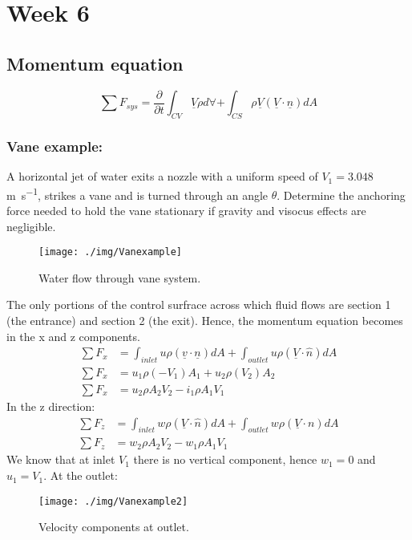 \chapter{Week 6}
\section{Momentum equation}
\begin{equation}
  \sum F_{sys} = \frac{\partial}{\partial t} \int_{CV} \underline{V} \rho d \forall + \int_{CS} \rho \underline{V} (\underline{V} \cdot \underline{n}) dA
\end{equation}
\subsection{Vane example:}
A horizontal jet of water exits a nozzle with a uniform speed of $V_1 = 3.048$ \si{\meter\per\second}, strikes a vane and is turned through an angle $\theta$. Determine the anchoring force needed to hold the vane stationary if gravity and visocus effects are negligible.
\begin{figure}[h]
  \centering
  \texttt{[image: ./img/Vanexample]}
  \caption{Water flow through vane system.}
\end{figure}
The only portions of the control surfrace across which fluid flows are section 1 (the entrance) and section 2 (the exit). Hence, the momentum equation becomes in the x and z components.
\begin{align}
  \sum F_x & = \int_{inlet} u \rho (\underline{v} \cdot \underline{n}) dA + \int_{outlet} u \rho (\underline{V} \cdot \hat{n}) dA \\
  \sum F_x & = u_1 \rho (-V_1) A_1 + u_2 \rho (V_2) A_2                                                                           \\
  \sum F_x & = u_2 \rho A_2 V_2 - i_1 \rho A_1 V_1
\end{align}
In the z direction:
\begin{align}
  \sum F_z & = \int_{inlet} w \rho (\underline{V}\cdot \hat{n}) dA + \int_{outlet} w \rho (\underline{V} \cdot {n}) dA \\
  \sum F_z & = w_2 \rho A_2 V_2 - w_1 \rho A_1 V_1
\end{align}
We know that at inlet $V_1$ there is no vertical component, hence $w_1 = 0$ and $u_1 = V_1$. At the outlet:
\begin{figure}
  \centering
  \texttt{[image: ./img/Vanexample2]}
  \caption{Velocity components at outlet.}
\end{figure}
